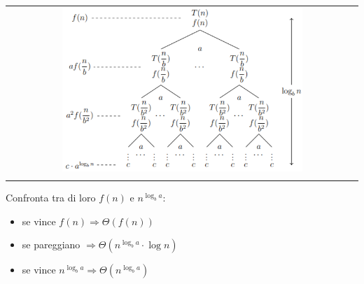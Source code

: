 \begin{center}
    \begin{tabular}{c}
        \\ \includegraphics[width=0.7\textwidth]{image/MasterTheorem.png} \\ \\
    \end{tabular}
\end{center}

Confronta tra di loro $f(n)$ e $n^{\log_ba}$:
\begin{itemize}
    \item se vince $f(n) \Rightarrow \Theta(f(n))$
    \item se pareggiano $\Rightarrow \Theta(n^{\log_ba} \cdot \log n)$
    \item se vince $n^{\log_ba} \Rightarrow \Theta(n^{\log_ba})$
\end{itemize}

\newpage